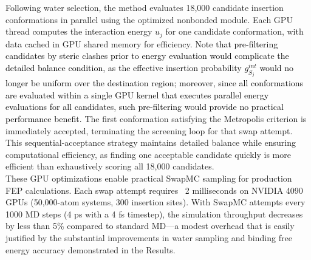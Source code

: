 \documentclass[journal=jacsat,manuscript=article]{achemso}
\newcommand*{\textblue}[1]{\textcolor{black}{#1}}
\begin{document}
Following water selection, the method evaluates 18,000 candidate insertion conformations in parallel using the optimized nonbonded module. 
Each GPU thread computes the interaction energy $u_j$ for one candidate conformation, with data cached in GPU shared memory for efficiency.
\textblue{
Note that pre-filtering candidates by steric clashes prior to energy evaluation would complicate the detailed balance condition, 
as the effective insertion probability $g^{int}_{S_j}$ would no longer be uniform over the destination region; 
moreover, since all conformations are evaluated within a single GPU kernel that executes parallel energy evaluations for all candidates, 
such pre-filtering would provide no practical performance benefit.
}
The first conformation satisfying the Metropolis criterion is immediately accepted, terminating the screening loop for that swap attempt.
This sequential-acceptance strategy maintains detailed balance while ensuring computational efficiency, 
as finding one acceptable candidate quickly is more efficient than exhaustively scoring all 18,000 candidates. \\
\newline
These GPU optimizations enable practical SwapMC sampling for production FEP calculations. 
Each swap attempt requires ~2 milliseconds on NVIDIA 4090 GPUs (50,000-atom systems, 300 insertion sites). 
With SwapMC attempts every 1000 MD steps (4 ps with a 4 fs timestep), the simulation throughput decreases by less than 5\% compared to 
standard MD—a modest overhead that is easily justified by the substantial improvements in water sampling and binding free energy accuracy demonstrated in the Results.
\end{document}
